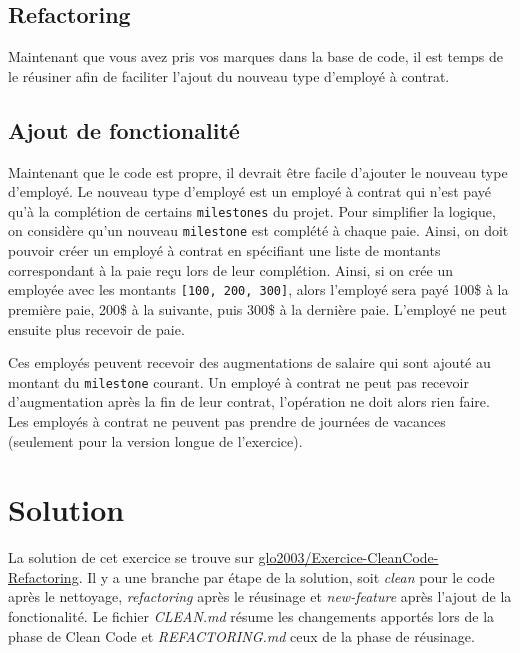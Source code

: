 \documentclass[french]{article}
\begin{document}
\subsection{Refactoring}

Maintenant que vous avez pris vos marques dans la base de code, il est temps de le réusiner afin de faciliter l'ajout du nouveau type d'employé à contrat.


\subsection{Ajout de fonctionalité}

Maintenant que le code est propre, il devrait être facile d'ajouter le nouveau type d'employé. Le nouveau type d'employé est un employé à contrat qui n'est payé qu'à la complétion de certains \texttt{milestones} du projet. Pour simplifier la logique, on considère qu'un nouveau \texttt{milestone} est complété à chaque paie. Ainsi, on doit pouvoir créer un employé à contrat en spécifiant une liste de montants correspondant à la paie reçu lors de leur complétion. Ainsi, si on crée un employée avec les montants \texttt{[100, 200, 300]}, alors l'employé sera payé 100\$ à la première paie, 200\$ à la suivante, puis 300\$ à la dernière paie. L'employé ne peut ensuite plus recevoir de paie.

Ces employés peuvent recevoir des augmentations de salaire qui sont ajouté au montant du \texttt{milestone} courant. Un employé à contrat ne peut pas recevoir d'augmentation après la fin de leur contrat, l'opération ne doit alors rien faire. Les employés à contrat ne peuvent pas prendre de journées de vacances (seulement pour la version longue de l'exercice).

\section{Solution}
La solution de cet exercice se trouve sur \href{https://github.com/glo2003/Exercice-CleanCode-Refactoring}{glo2003/Exercice-CleanCode-Refactoring}. Il y a une branche par étape de la solution, soit \textit{clean} pour le code après le nettoyage, \textit{refactoring} après le réusinage et \textit{new-feature} après l'ajout de la fonctionalité. Le fichier \textit{CLEAN.md} résume les changements apportés lors de la phase de Clean Code et \textit{REFACTORING.md} ceux de la phase de réusinage.



\end{document}

